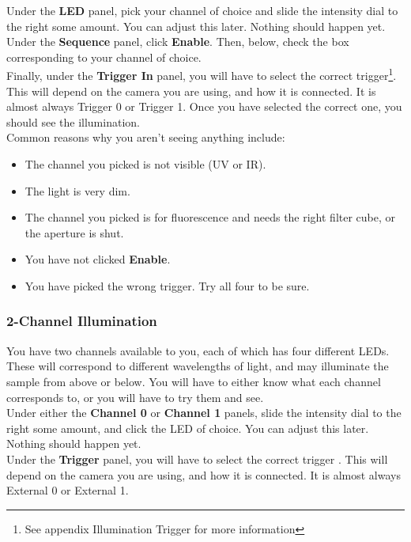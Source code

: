 \documentclass{article}
\begin{document}
Under the \textbf{LED} panel, pick your channel of choice and slide the intensity dial to the right some amount. You can adjust this later. Nothing should happen yet.\\

Under the \textbf{Sequence} panel, click \textbf{Enable}. Then, below, check the box corresponding to your channel of choice.\\

Finally, under the \textbf{Trigger In} panel, you will have to select the correct trigger\footnote{See appendix Illumination Trigger for more information}. This will depend on the camera you are using, and how it is connected. It is almost always Trigger 0 or Trigger 1. Once you have selected the correct one, you should see the illumination.\\

Common reasons why you aren't seeing anything include:
\begin{itemize}
	\item The channel you picked is not visible (UV or IR).
	\item The light is very dim.
	\item The channel you picked is for fluorescence and needs the right filter cube, or the aperture is shut.
	\item You have not clicked \textbf{Enable}.
	\item You have picked the wrong trigger. Try all four to be sure.
\end{itemize}

\newpage

\subsubsection{2-Channel Illumination}

You have two channels available to you, each of which has four different LEDs. These will correspond to different wavelengths of light, and may illuminate the sample from above or below. You will have to either know what each channel corresponds to, or you will have to try them and see.\\

Under either the \textbf{Channel 0} or \textbf{Channel 1} panels, slide the intensity dial to the right some amount, and click the LED of choice. You can adjust this later. Nothing should happen yet.\\

Under the \textbf{Trigger} panel, you will have to select the correct trigger \footnotemark[\value{footnote}]. This will depend on the camera you are using, and how it is connected. It is almost always External 0 or External 1.\\
\end{document}
